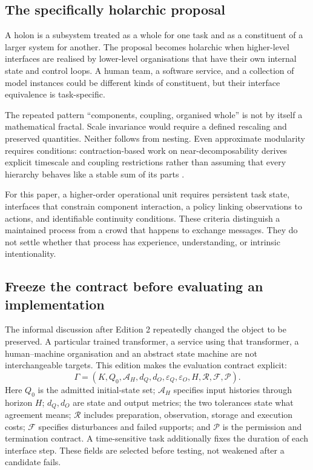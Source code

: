 \documentclass[11pt,a4paper]{article}
\theoremstyle{definition}
\theoremstyle{remark}
\begin{document}
\subsection{The specifically holarchic proposal}
A holon is a subsystem treated as a whole for one task and as a constituent of a larger system for another. The proposal becomes holarchic when higher-level interfaces are realised by lower-level organisations that have their own internal state and control loops. A human team, a software service, and a collection of model instances could be different kinds of constituent, but their interface equivalence is task-specific.

The repeated pattern ``components, coupling, organised whole'' is not by itself a mathematical fractal. Scale invariance would require a defined rescaling and preserved quantities. Neither follows from nesting. Even approximate modularity requires conditions: contraction-based work on near-decomposability derives explicit timescale and coupling restrictions rather than assuming that every hierarchy behaves like a stable sum of its parts \citep{bousquet}.

For this paper, a higher-order operational unit requires persistent task state, interfaces that constrain component interaction, a policy linking observations to actions, and identifiable continuity conditions. These criteria distinguish a maintained process from a crowd that happens to exchange messages. They do not settle whether that process has experience, understanding, or intrinsic intentionality.

\subsection{Freeze the contract before evaluating an implementation}\label{subsec:contractfreeze}
The informal discussion after Edition 2 repeatedly changed the object to be preserved. A particular trained transformer, a service using that transformer, a human--machine organisation and an abstract state machine are not interchangeable targets. This edition makes the evaluation contract explicit:
\begin{equation}\label{eq:contract3}
 \Gamma=(K,Q_0,\mathcal A_H,d_Q,d_O,\varepsilon_Q,\varepsilon_O,H,\mathcal R,\mathcal F,\mathcal P).
\end{equation}
Here $Q_0$ is the admitted initial-state set; $\mathcal A_H$ specifies input histories through horizon $H$; $d_Q,d_O$ are state and output metrics; the two tolerances state what agreement means; $\mathcal R$ includes preparation, observation, storage and execution costs; $\mathcal F$ specifies disturbances and failed supports; and $\mathcal P$ is the permission and termination contract. A time-sensitive task additionally fixes the duration of each interface step. These fields are selected before testing, not weakened after a candidate fails.
\end{document}
